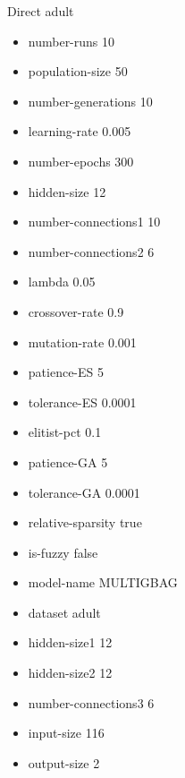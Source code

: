 Direct
adult
\begin{itemize}
\item number-runs 10
\item population-size 50
\item number-generations 10
\item learning-rate 0.005
\item number-epochs 300
\item hidden-size 12
\item number-connections1 10
\item number-connections2 6
\item lambda 0.05
\item crossover-rate 0.9
\item mutation-rate 0.001
\item patience-ES 5
\item tolerance-ES 0.0001
\item elitist-pct 0.1
\item patience-GA 5
\item tolerance-GA 0.0001
\item relative-sparsity true
\item is-fuzzy false
\item model-name MULTIGBAG
\item dataset adult
\item hidden-size1 12
\item hidden-size2 12
\item number-connections3 6
\item input-size 116
\item output-size 2
\end{itemize}

